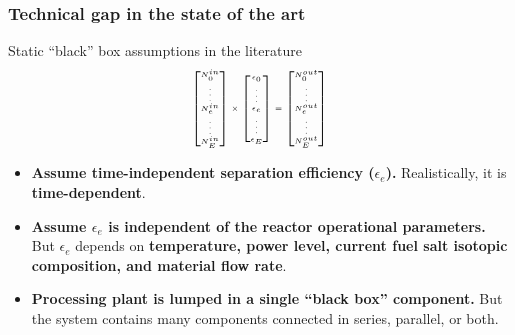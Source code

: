 \begin{frame}
\frametitle{Technical gap in the state of the art}
\vspace{-0.2in}
\begin{block}{Static ``black'' box assumptions in the literature}
	\begin{equation*}
	{\tiny  
		\setlength{\abovedisplayskip}{6pt}
		\setlength{\belowdisplayskip}{\abovedisplayskip}
		\setlength{\abovedisplayshortskip}{0pt}
		\setlength{\belowdisplayshortskip}{3pt}
	\begin{aligned}
	\begin{bmatrix}
	N^{in}_{0} \\ \vdots \\ N^{in}_{e} \\ \vdots \\ N^{in}_{E} \\
	\end{bmatrix} 
	\times
	\begin{bmatrix}
	\epsilon_{0} \\ \vdots \\ \epsilon_{e} \\ \vdots \\ \epsilon_{E} \\
	\end{bmatrix} =
	\begin{bmatrix}
	N^{out}_{0}\\ \vdots \\ N^{out}_{e} \\ \vdots \\N^{out}_{E}  \\
	\end{bmatrix}
	\end{aligned}
	}
	\end{equation*}
	\begin{itemize}
		\item \textbf{Assume time-independent separation efficiency ($\epsilon_e$).} Realistically, 
		it is \textbf{time-dependent}.
		\item \textbf{Assume $\epsilon_e$ is independent of the reactor operational 
		parameters.} But $\epsilon_e$ depends on \textbf{temperature, power level, current fuel salt isotopic composition, and material flow rate}.
		\item \textbf{Processing plant is lumped in a single ``black	box'' component.} But the system contains many components connected in series, parallel, or both. 
	\end{itemize}
\end{block}
\end{frame}


